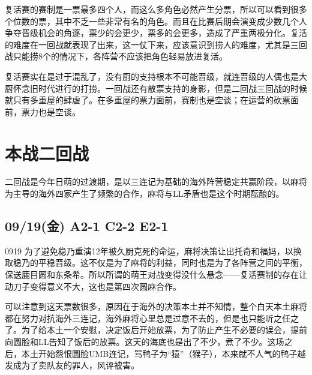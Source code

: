 复活赛的赛制是一票最多四个人，而这么多角色必然产生分票，所以可以看到很多个位数的票，其中不乏一些非常有名的角色。而且在比赛后期会演变成少数几个人争夺晋级机会的角逐，票少的会更少，票多的会更多，造成了严重两极分化。复活的难度在一回战就表现了出来，这一仗下来，应该意识到捞人的难度，尤其是三回战只能捞8个的情况下，各阵营不应该把角色轻易放进复活。

复活赛实在是过于混乱了，没有厨的支持根本不可能晋级，就连晋级的人偶也是大厨怀念旧时代进行的打捞。一回战还有散票支持的身影，但是二回战三回战的时候就只有多重屋的肆虐了。在多重屋的票力面前，赛制也是空谈；在运营的砍票面前，票力也是空谈。

\chapter{本战二回战}

二回战是今年日萌的过渡期，是以三连记为基础的海外阵营稳定共赢阶段，以麻将为主导的海外四家产生了频繁的合作，麻将与LL矛盾也是这个时期酝酿的。

\section{09/19(金) A2-1 C2-2 E2-1}


0919 为了避免稳乃重演12年被久厨克死的命运，麻将决策让出托奇和福妈，以换取稳乃的平稳晋级。这不仅是为了麻将的利益，同时也是为了各阵营之间的平衡，保送鹿目圆和东条希。所以所谓的萌王对战变得没什么悬念——复活赛制的存在让动刀子变得意义不大，这也是第四次圆麻合作。

可以注意到这天票数很多，原因在于海外的决策本土并不知情，整个白天本土麻将都在努力对抗海外三连记，海外麻将心里总是过意不去的，但是也只能听之任之了。为了给本土一个安慰，决定饭后开始放票，为了防止产生不必要的误会，提前向圆脸和LL告知了饭后的放票。这天的海底也是出了不少，煮了不少。这场之后，本土开始怨恨圆脸UMB连记，骂鸭子为“猿”（猴子），本来就不人气的鸭子越发成为了卖队友的罪人，风评被害。


